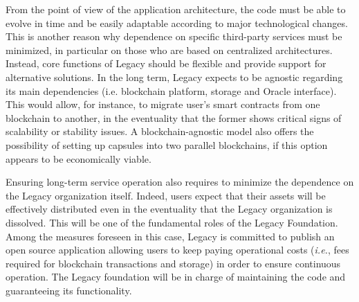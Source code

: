 From the point of view of the application architecture, the code must be able to evolve in time and be easily adaptable according to major technological changes. This is another reason why dependence on specific third-party services must be minimized, in particular on those who are based on centralized architectures. Instead, core functions of Legacy should be flexible and provide support for alternative solutions. In the long term, Legacy expects to be agnostic regarding its main dependencies (i.e. blockchain platform, storage and Oracle interface). This would allow, for instance, to migrate user’s smart contracts from one blockchain to another, in the eventuality that the former shows critical signs of scalability or stability issues. A blockchain-agnostic model also offers the possibility of setting up capsules into two parallel blockchains, if this option appears to be economically viable.    

Ensuring long-term service operation also requires to minimize the dependence on the Legacy organization itself. Indeed, users expect that their assets will be effectively distributed even in the eventuality that the Legacy organization is dissolved. 
This will be one of the fundamental roles of the Legacy Foundation. Among the measures foreseen in this case, Legacy is committed to publish an open source application allowing users to keep paying operational costs (\textit{i.e.}, fees required for blockchain transactions and storage) in order to ensure continuous operation. The Legacy foundation will be in charge of maintaining the code and guaranteeing its functionality.


